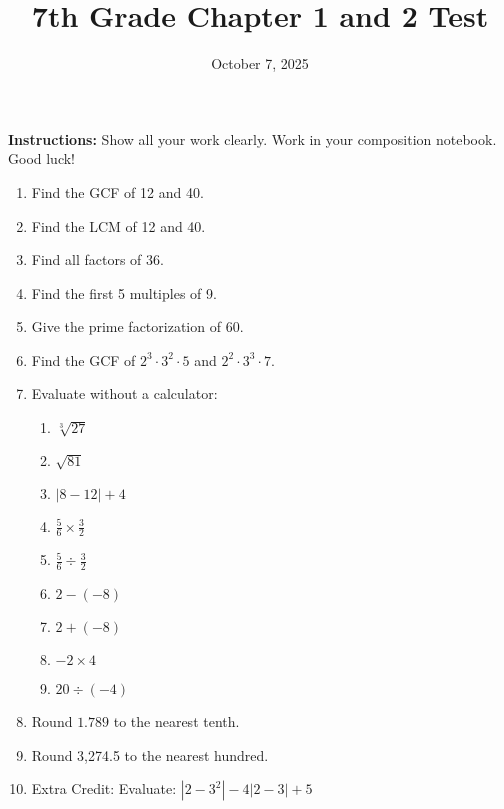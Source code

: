 \documentclass[11pt]{article}
\title{7th Grade Chapter 1 and 2 Test}
\date{October 7, 2025}
\begin{document}
\maketitle

\textbf{Instructions:} Show all your work clearly.  Work in your composition notebook.  Good luck!

\begin{enumerate}
    \item Find the GCF of 12 and 40.
    \item Find the LCM of 12 and 40.
    \item Find all factors of 36.
    \item Find the first 5 multiples of 9.
    \item Give the prime factorization of 60.
    \item Find the GCF of $2^3\cdot 3^2\cdot 5$ and $2^2\cdot 3^3\cdot 7$.
    \item Evaluate without a calculator: 
    \begin{enumerate}
       \item $\sqrt[3]{27}$
       \item $\sqrt{81}$
       \item $|8 - 12| + 4$
       \item $\frac{5}{6} \times \frac{3}{2}$
       \item $\frac{5}{6} \div \frac{3}{2}$
       \item $2-  (-8)$
       \item $2 + (-8)$
       \item $-2 \times 4$
       \item $ 20 \div (-4)$
    \end{enumerate}
    \item Round $1.789$ to the nearest tenth.
    \item Round 3,274.5 to the nearest hundred.
    \item Extra Credit: Evaluate: $|2-3^2| - 4 |2-3| + 5$
\end{enumerate}
\end{document}
